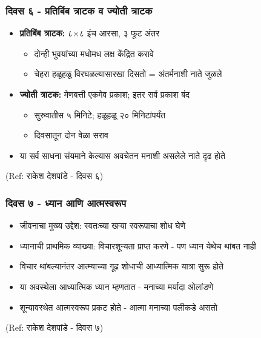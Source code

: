 \begin{frame}[fragile]\frametitle{दिवस ६ - प्रतिबिंब त्राटक व ज्योती त्राटक}

	\begin{itemize}
	\item \textbf{प्रतिबिंब त्राटक:} ८$\times$८ इंच आरसा, ३ फूट अंतर
		\begin{itemize}
		\item दोन्ही भुवयांच्या मधोमध लक्ष केंद्रित करावे
		\item चेहरा हळूहळू विरघळल्यासारखा दिसतो = अंतर्मनाशी नाते जुळले
		\end{itemize}
	\item \textbf{ज्योती त्राटक:} मेणबत्ती एकमेव प्रकाश; इतर सर्व प्रकाश बंद
		\begin{itemize}
		\item सुरुवातीस ५ मिनिटे; हळूहळू २० मिनिटांपर्यंत
		\item दिवसातून दोन वेळा सराव
		\end{itemize}
	\item या सर्व साधना संयमाने केल्यास अवचेतन मनाशी असलेले नाते दृढ होते
	\end{itemize}

{\tiny (Ref: राकेश देशपांडे - दिवस ६)}

\end{frame}


\begin{frame}[fragile]\frametitle{दिवस ७ - ध्यान आणि आत्मस्वरूप}

	\begin{itemize}
	\item जीवनाचा मुख्य उद्देश: स्वतःच्या खऱ्या स्वरूपाचा शोध घेणे
	\item ध्यानाची प्राथमिक व्याख्या: विचारशून्यता प्राप्त करणे - पण ध्यान येथेच थांबत नाही
	\item विचार थांबल्यानंतर आत्म्याच्या गूढ शोधाची आध्यात्मिक यात्रा सुरू होते
	\item या अवस्थेला आध्यात्मिक ध्यान म्हणतात - मनाच्या मर्यादा ओलांडणे
	\item शून्यावस्थेत आत्मस्वरूप प्रकट होते - आत्मा मनाच्या पलीकडे असतो
	\end{itemize}

{\tiny (Ref: राकेश देशपांडे - दिवस ७)}

\end{frame}

